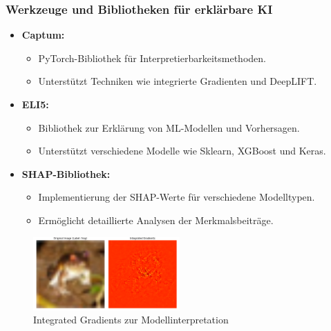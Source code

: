 \documentclass[aspectratio=1610, xcolor=dvipsnames, 9pt]{beamer}
\begin{document}
\begin{frame}
  \frametitle{Werkzeuge und Bibliotheken für erklärbare KI}
  \begin{itemize}
      \item \textbf{Captum:}
      \begin{itemize}
          \item PyTorch-Bibliothek für Interpretierbarkeitsmethoden.
          \item Unterstützt Techniken wie integrierte Gradienten und DeepLIFT.
      \end{itemize}
      \item \textbf{ELI5:}
      \begin{itemize}
          \item Bibliothek zur Erklärung von ML-Modellen und Vorhersagen.
          \item Unterstützt verschiedene Modelle wie Sklearn, XGBoost und Keras.
      \end{itemize}
      \item \textbf{SHAP-Bibliothek:}
      \begin{itemize}
          \item Implementierung der SHAP-Werte für verschiedene Modelltypen.
          \item Ermöglicht detaillierte Analysen der Merkmalsbeiträge.
      \end{itemize}
  \end{itemize}
  \begin{figure}
      \centering
        \includegraphics[width=0.5\textwidth]{images/integrated_gradients.png}
        \caption{Integrated Gradients zur Modellinterpretation}
  \end{figure}
\end{frame}
\end{document}
